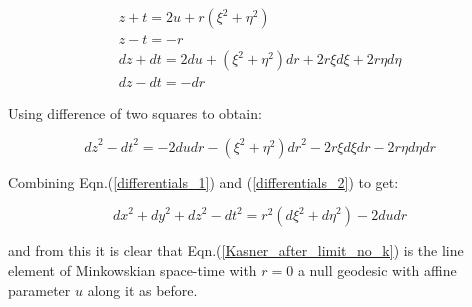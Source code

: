 \begin{eqnarray*}
z + t = 2 u + r (\xi^2 + \eta^2) \\
z - t = - r \\
{dz} + {dt} = 2 du + (\xi^2 + \eta^2) dr + 2 r \xi {d\xi} + 2 r \eta {d\eta} \\
{dz} - {dt} = - dr 
\end{eqnarray*}

\noindent Using difference of two squares to obtain:

\begin{equation}\label{differentials_2}
{dz}^2 - {dt}^2 = -2 {du}{dr} - (\xi^2 + \eta^2) {dr}^2 - 2 r \xi {d\xi}{dr} - 2 r \eta {d\eta}{dr}
\end{equation}

\noindent Combining Eqn.(\ref{differentials_1}) and (\ref{differentials_2}) to get:

\begin{equation*}
{dx}^2 + {dy}^2 + {dz}^2 - {dt}^2 = r^2 ({d\xi}^2 + {d\eta}^2) - 2 {du}{dr}
\end{equation*}

\noindent and from this it is clear that Eqn.(\ref{Kasner_after_limit_no_k}) is the line element of Minkowskian space-time with $r = 0$ a null geodesic with affine parameter $u$ along it as before. 
